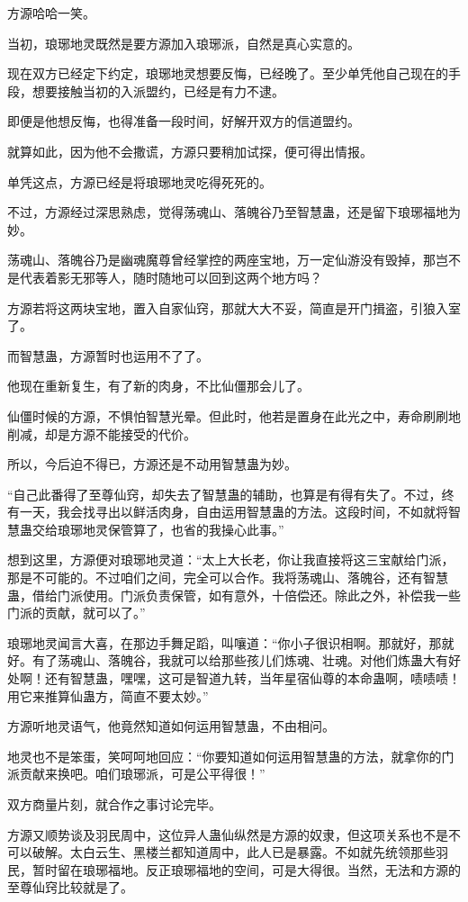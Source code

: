 \begin{this_body}
方源哈哈一笑。

当初，琅琊地灵既然是要方源加入琅琊派，自然是真心实意的。

现在双方已经定下约定，琅琊地灵想要反悔，已经晚了。至少单凭他自己现在的手段，想要接触当初的入派盟约，已经是有力不逮。

即便是他想反悔，也得准备一段时间，好解开双方的信道盟约。

就算如此，因为他不会撒谎，方源只要稍加试探，便可得出情报。

单凭这点，方源已经是将琅琊地灵吃得死死的。

不过，方源经过深思熟虑，觉得荡魂山、落魄谷乃至智慧蛊，还是留下琅琊福地为妙。

荡魂山、落魄谷乃是幽魂魔尊曾经掌控的两座宝地，万一定仙游没有毁掉，那岂不是代表着影无邪等人，随时随地可以回到这两个地方吗？

方源若将这两块宝地，置入自家仙窍，那就大大不妥，简直是开门揖盗，引狼入室了。

而智慧蛊，方源暂时也运用不了了。

他现在重新复生，有了新的肉身，不比仙僵那会儿了。

仙僵时候的方源，不惧怕智慧光晕。但此时，他若是置身在此光之中，寿命刷刷地削减，却是方源不能接受的代价。

所以，今后迫不得已，方源还是不动用智慧蛊为妙。

“自己此番得了至尊仙窍，却失去了智慧蛊的辅助，也算是有得有失了。不过，终有一天，我会找寻出以鲜活肉身，自由运用智慧蛊的方法。这段时间，不如就将智慧蛊交给琅琊地灵保管算了，也省的我操心此事。”

想到这里，方源便对琅琊地灵道：“太上大长老，你让我直接将这三宝献给门派，那是不可能的。不过咱们之间，完全可以合作。我将荡魂山、落魄谷，还有智慧蛊，借给门派使用。门派负责保管，如有意外，十倍偿还。除此之外，补偿我一些门派的贡献，就可以了。”

琅琊地灵闻言大喜，在那边手舞足蹈，叫嚷道：“你小子很识相啊。那就好，那就好。有了荡魂山、落魄谷，我就可以给那些孩儿们炼魂、壮魂。对他们炼蛊大有好处啊！还有智慧蛊，嘿嘿，这可是智道九转，当年星宿仙尊的本命蛊啊，啧啧啧！用它来推算仙蛊方，简直不要太妙。”

方源听地灵语气，他竟然知道如何运用智慧蛊，不由相问。

地灵也不是笨蛋，笑呵呵地回应：“你要知道如何运用智慧蛊的方法，就拿你的门派贡献来换吧。咱们琅琊派，可是公平得很！”

双方商量片刻，就合作之事讨论完毕。

方源又顺势谈及羽民周中，这位异人蛊仙纵然是方源的奴隶，但这项关系也不是不可以破解。太白云生、黑楼兰都知道周中，此人已是暴露。不如就先统领那些羽民，暂时留在琅琊福地。反正琅琊福地的空间，可是大得很。当然，无法和方源的至尊仙窍比较就是了。


\end{this_body}
